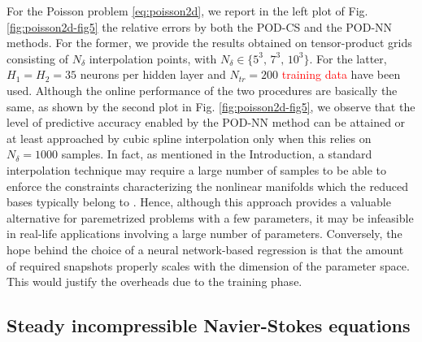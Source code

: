 \documentclass[longtitle]{elsarticle}
\numberwithin{equation}{section}
\theoremstyle{theorem}
\theoremstyle{definition}
\theoremstyle{remark}
\theoremstyle{proposition}
\numberwithin{figure}{section}
\begin{document}
		For the Poisson problem \eqref{eq:poisson2d}, we report in the left plot of Fig. \ref{fig:poisson2d-fig5} the relative errors by both the POD-CS and the POD-NN methods. For the former, we provide the results obtained on tensor-product grids consisting of $N_{\delta}$ interpolation points, with $N_{\delta} \in \lbrace 5^3, \, 7^3, \, 10^3 \rbrace$. For the latter, $H_1 = H_2 = 35$ neurons per hidden layer and $N_{tr} = 200$ \textcolor{red}{training data} have been used. Although the online performance of the two procedures are basically the same, as shown by the second plot in Fig. \ref{fig:poisson2d-fig5}, we observe that the level of predictive accuracy enabled by the POD-NN method can be attained or at least approached by cubic spline interpolation only when this relies on $N_{\delta} = 1000$ samples. In fact, as mentioned in the Introduction, a standard interpolation technique may require a large number of samples to be able to enforce the constraints characterizing the nonlinear manifolds which the reduced bases typically belong to \cite{Ams10}. Hence, although this approach provides a valuable alternative for paremetrized problems with a few parameters, it may be infeasible in real-life applications involving a large number of parameters. Conversely, the hope behind the choice of a neural network-based regression is that the amount of required snapshots properly scales with the dimension of the parameter space. This would justify the overheads due to the training phase.
		
		
		
		
	\subsection{Steady incompressible Navier-Stokes equations}
	\label{section:Steady incompressible Navier-Stokes equations}
	
\end{document}
